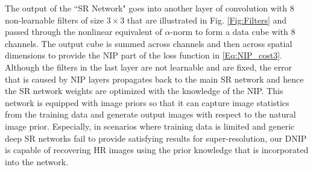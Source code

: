 \documentclass[9pt]{article}
\newcommand{\mat}[1]{\pmb{#1}}
\def\bea{\begin{eqnarray}}
\def\eea{\end{eqnarray}}
\def\tcb{\textcolor{blue}}
\begin{document}
The output of the ``SR Network" goes into another layer of convolution with 8 non-learnable filters of size $3\times 3$ that are illustrated in Fig. \ref{Fig:Filters} and passed through the nonlinear equivalent of $\alpha$-norm to form a data cube with 8 channels. The output cube is summed across channels and then across spatial dimensions to provide the NIP part of the loss function in \eqref{Eq:NIP_cost3}. %
Although the filters in the last layer are not learnable and are fixed, the error that is caused by NIP layers propagates back to the main SR network and hence the SR network weights are optimized with the knowledge of the NIP.
This network is equipped with image priors so that it can capture image statistics from the training data and generate output images with respect to the natural image prior. Especially, in scenarios where training data is limited and generic deep SR networks fail to provide satisfying results for super-resolution, our DNIP is capable of recovering HR images using the prior knowledge that is incorporated into the network. %
\end{document}
